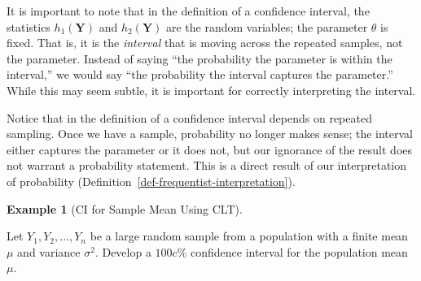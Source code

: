 \documentclass[
  letterpaper,
  DIV=11,
  numbers=noendperiod]{scrreprt}
\theoremstyle{definition}
\theoremstyle{definition}
\newtheorem{example}{Example}[chapter]
\theoremstyle{plain}
\theoremstyle{remark}
\begin{document}
\begin{tcolorbox}[enhanced jigsaw, title=\textcolor{quarto-callout-warning-color}{\faExclamationTriangle}\hspace{0.5em}{Warning}, colbacktitle=quarto-callout-warning-color!10!white, titlerule=0mm, toptitle=1mm, breakable, bottomtitle=1mm, colframe=quarto-callout-warning-color-frame, opacitybacktitle=0.6, bottomrule=.15mm, arc=.35mm, toprule=.15mm, colback=white, rightrule=.15mm, coltitle=black, leftrule=.75mm, left=2mm, opacityback=0]

It is important to note that in the definition of a confidence interval,
the statistics \(h_1(\mathbf{Y})\) and \(h_2(\mathbf{Y})\) are the
random variables; the parameter \(\theta\) is fixed. That is, it is the
\emph{interval} that is moving across the repeated samples, not the
parameter. Instead of saying ``the probability the parameter is within
the interval,'' we would say ``the probability the interval captures the
parameter.'' While this may seem subtle, it is important for correctly
interpreting the interval.

\end{tcolorbox}

Notice that in the definition of a confidence interval depends on
repeated sampling. Once we have a sample, probability no longer makes
sense; the interval either captures the parameter or it does not, but
our ignorance of the result does not warrant a probability statement.
This is a direct result of our interpretation of probability
(Definition~\ref{def-frequentist-interpretation}).

\begin{example}[CI for Sample Mean Using
CLT]\protect\hypertarget{exm-ci-clt}{}\label{exm-ci-clt}

Let \(Y_1, Y_2, \dotsc, Y_n\) be a large random sample from a population
with a finite mean \(\mu\) and variance \(\sigma^2\). Develop a
\(100c\)\% confidence interval for the population mean \(\mu\).

\end{example}
\end{document}
